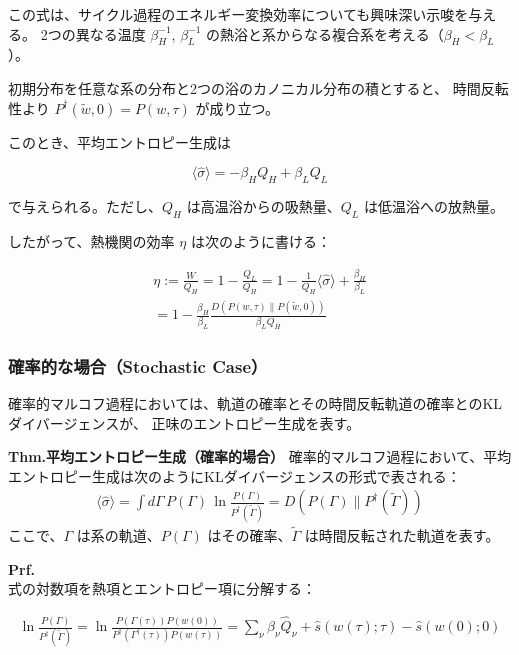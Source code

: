 \documentclass[a4paper,11pt]{jsarticle}
\numberwithin{equation}{section}
\begin{document}
この式は、サイクル過程のエネルギー変換効率についても興味深い示唆を与える。
2つの異なる温度 $\beta_H^{-1}$, $\beta_L^{-1}$ の熱浴と系からなる複合系を考える（$\beta_H < \beta_L$）。

初期分布を任意な系の分布と2つの浴のカノニカル分布の積とすると、
時間反転性より $P^†(\tilde{w}, 0) = P(w, \tau)$ が成り立つ。

このとき、平均エントロピー生成は

\[
\langle \hat{\sigma} \rangle = -\beta_H Q_H + \beta_L Q_L
\]

で与えられる。ただし、$Q_H$ は高温浴からの吸熱量、$Q_L$ は低温浴への放熱量。

したがって、熱機関の効率 $\eta$ は次のように書ける：

\begin{align}
\eta
:= \frac{W}{Q_H}
= 1 - \frac{Q_L}{Q_H}
= 1 - \frac{1}{Q_H} \langle \hat{\sigma} \rangle + \frac{\beta_H}{\beta_L} \\
= 1 - \frac{\beta_H}{\beta_L}
\frac{D(P(w, \tau) \| P(\tilde{w}, 0))}{\beta_L Q_H}
\end{align}

\subsubsection{確率的な場合（Stochastic Case）}

確率的マルコフ過程においては、軌道の確率とその時間反転軌道の確率とのKLダイバージェンスが、
正味のエントロピー生成を表す。

\begin{itembox}[l]{\textbf{Thm.平均エントロピー生成（確率的場合）}}
    確率的マルコフ過程において、平均エントロピー生成は次のようにKLダイバージェンスの形式で表される：
\begin{align}
\langle \hat{\sigma} \rangle
= \int d\Gamma\, P(\Gamma)\, \ln \frac{P(\Gamma)}{P^†(\tilde{\Gamma})}
= D(P(\Gamma) \| P^†(\tilde{\Gamma}))
\end{align}
ここで、$\Gamma$ は系の軌道、$P(\Gamma)$ はその確率、$\tilde{\Gamma}$ は時間反転された軌道を表す。
\end{itembox}
\textbf{Prf.} \\

式の対数項を熱項とエントロピー項に分解する：

\begin{align}
\ln \frac{P(\Gamma)}{P^†(\tilde{\Gamma})}
= \ln \frac{P(\Gamma(\tau)) P(w(0))}{P^†(\Gamma^†(\tau)) P(w(\tau))}
= \sum_\nu \beta_\nu \hat{Q}_\nu + \hat{s}(w(\tau); \tau) - \hat{s}(w(0); 0)
\end{align}
\end{document}
